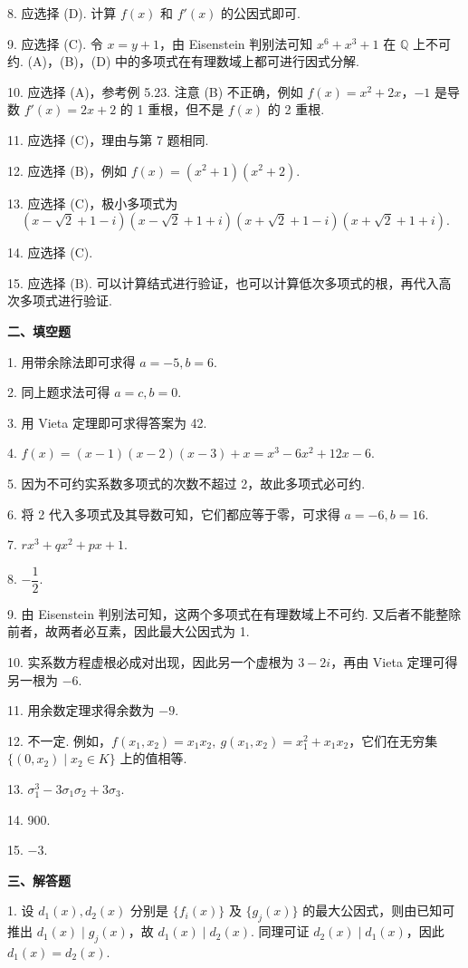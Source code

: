 \documentclass[UTF8, 12pt, fontset=fandol, oneside]{ctexart}
\begin{document}
8. 应选择 (D). 计算 $f(x)$ 和 $f'(x)$ 的公因式即可.

9. 应选择 (C). 令 $x=y+1$，由 Eisenstein 判别法可知 $x^6+x^3+1$ 在 $\mathbb{Q}$ 上不可约. (A)，(B)，(D) 中的多项式在有理数域上都可进行因式分解.

10. 应选择 (A)，参考例 5.23. 注意 (B) 不正确，例如 $f(x)=x^2+2x$，$-1$ 是导数 $f'(x)=2x+2$ 的 1 重根，但不是 $f(x)$ 的 2 重根.

11. 应选择 (C)，理由与第 7 题相同.

12. 应选择 (B)，例如 $f(x)=(x^2+1)(x^2+2)$.

13. 应选择 (C)，极小多项式为
\[
(x-\sqrt{2}+1-i)(x-\sqrt{2}+1+i)(x+\sqrt{2}+1-i)(x+\sqrt{2}+1+i).
\]

14. 应选择 (C).

15. 应选择 (B). 可以计算结式进行验证，也可以计算低次多项式的根，再代入高次多项式进行验证.

\noindent\textbf{二、填空题}

1. 用带余除法即可求得 $a=-5,b=6$.

2. 同上题求法可得 $a=c,b=0$.

3. 用 Vieta 定理即可求得答案为 42.

4. $f(x)=(x-1)(x-2)(x-3)+x=x^3-6x^2+12x-6$.

5. 因为不可约实系数多项式的次数不超过 2，故此多项式必可约.

6. 将 2 代入多项式及其导数可知，它们都应等于零，可求得 $a=-6,b=16$.

7. $rx^3+qx^2+px+1$.

8. $-\dfrac{1}{2}$.

9. 由 Eisenstein 判别法可知，这两个多项式在有理数域上不可约. 又后者不能整除前者，故两者必互素，因此最大公因式为 1.

10. 实系数方程虚根必成对出现，因此另一个虚根为 $3-2i$，再由 Vieta 定理可得另一根为 $-6$.

11. 用余数定理求得余数为 $-9$.

12. 不一定. 例如，$f(x_1,x_2)=x_1x_2,\ g(x_1,x_2)=x_1^2+x_1x_2$，它们在无穷集 $\{(0,x_2)\mid x_2\in K\}$ 上的值相等.

13. $\sigma_1^3-3\sigma_1\sigma_2+3\sigma_3$.

14. 900.

15. $-3$.

\noindent\textbf{三、解答题}

1. 设 $d_1(x),d_2(x)$ 分别是 $\{f_i(x)\}$ 及 $\{g_j(x)\}$ 的最大公因式，则由已知可推出 $d_1(x)\mid g_j(x)$，故 $d_1(x)\mid d_2(x)$. 同理可证 $d_2(x)\mid d_1(x)$，因此 $d_1(x)=d_2(x)$.
\end{document}
